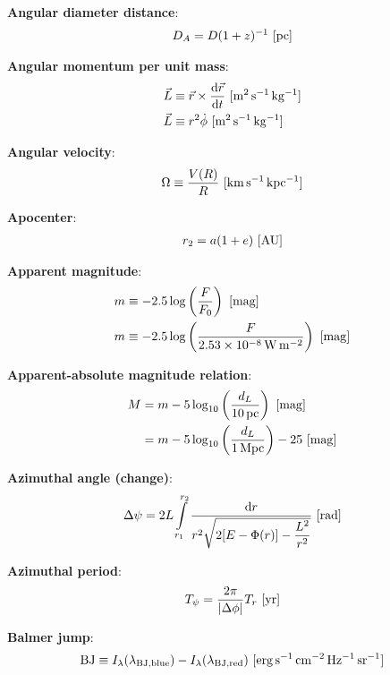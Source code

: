 \documentclass[a4paper,10pt]{article}
\begin{document}
{\noindent}\textbf{Angular diameter distance}:
\begin{align*}
    D_A = D(1+z)^{-1} ~ [{\rm pc}]
\end{align*}

{\noindent}\textbf{Angular momentum per unit mass}:
\begin{align*}
    \vec{L}&\equiv\vec{r}\times\frac{{\rm d}\vec{r}}{{\rm d}t} ~ [{\rm m^2\,s^{-1}\,kg^{-1}}] \\
    \vec{L}&\equiv r^2\dot{\phi} ~ [{\rm m^2\,s^{-1}\,kg^{-1}}]
\end{align*}

{\noindent}\textbf{Angular velocity}:
\begin{align*}
    \Omega \equiv \frac{V(R)}{R} ~ [{\rm km\,s^{-1}\,kpc^{-1}}]
\end{align*}

{\noindent}\textbf{Apocenter}:
\begin{align*}
    r_2 = a(1+e) ~ [{\rm AU}]
\end{align*}

{\noindent}\textbf{Apparent magnitude}:
\begin{align*}
     m &\equiv -2.5\log\left(\frac{F}{F_0}\right) ~ [{\rm mag}] \\
     m &\equiv -2.5\log\left(\frac{F}{2.53\times10^{-8}\,{\rm W\,m^{-2}}}\right) ~ [{\rm mag}]
\end{align*}

{\noindent}\textbf{Apparent-absolute magnitude relation}:
\begin{align*}
    M &= m -5\log_{10}\left(\frac{d_L}{10\,{\rm pc}}\right) ~ [{\rm mag}] \\
      &= m -5\log_{10}\left(\frac{d_L}{1\,{\rm Mpc}}\right)-25 ~ [{\rm mag}]
\end{align*}

{\noindent}\textbf{Azimuthal angle (change)}:
\begin{align*}
    \Delta\psi = 2L\int\limits_{r_1}^{r_2} \frac{{\rm d}r}{r^2\sqrt{2[E-\Phi(r)]-\dfrac{L^2}{r^2}}} ~ [{\rm rad}]
\end{align*}

{\noindent}\textbf{Azimuthal period}:
\begin{align*}
    T_\psi = \frac{2\pi}{\lvert\Delta\phi\rvert}T_r ~ [{\rm yr}]
\end{align*}

{\noindent}\textbf{Balmer jump}:
\begin{align*}
    {\rm BJ}\equiv I_\lambda(\lambda_{\rm BJ,blue}) - I_\lambda(\lambda_{\rm BJ,red}) ~ [{\rm erg\,s^{-1}\,cm^{-2}\,Hz^{-1}\,sr^{-1}}]
\end{align*}
\end{document}
